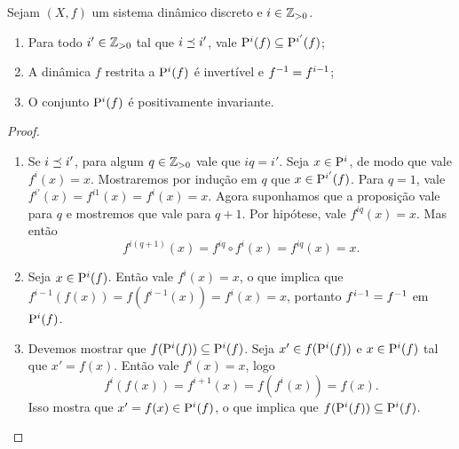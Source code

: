 \begin{proposition}
Sejam $(X,f)$ um sistema dinâmico discreto e $i \in \Z_{>0}$.
	\begin{enumerate}
	\item Para todo $i' \in \Z_{>0}$ tal que $i \dleq i'$, vale $\Per[i](f) \subseteq \Per[i'](f)$;
	\item A dinâmica $f$ restrita a $\Per[i](f)$ é invertível e $f\inv = f^{i-1}$;
	\item O conjunto $\Per[i](f)$ é positivamente invariante.
	\end{enumerate}
\end{proposition}
\begin{proof}
	\begin{enumerate}
	\item Se $i \dleq i'$, para algum $q \in \Z_{>0}$ vale que $iq=i'$. Seja $x \in \Per[i]$, de modo que vale $f^{i}(x)=x$. Mostraremos por indução em $q$ que $x \in \Per[i'](f)$. Para $q=1$, vale $f^{i'}(x) = f^{i1}(x) = f^i(x) = x$. Agora suponhamos que a proposição vale para $q$ e mostremos que vale para $q+1$. Por hipótese, vale $f^{iq}(x) = x$. Mas então
		\begin{equation*}
		f^{i(q+1)}(x) = f^{iq} \circ f^i(x) = f^{iq}(x) = x.
		\end{equation*}

	\item Seja $x \in \Per[i](f)$. Então vale $f^i(x)=x$, o que implica que $f^{i-1}(f(x)) = f(f^{i-1}(x)) = f^i(x) = x$, portanto $f^{i-1} = f\inv$ em $\Per[i](f)$.

	\item Devemos mostrar que $f(\Per[i](f)) \subseteq \Per[i](f)$. Seja $x' \in f(\Per[i](f))$ e $x \in \Per[i](f)$ tal que $x'=f(x)$. Então vale $f^i(x) = x$, logo
		\begin{equation*}
		f^i(f(x)) = f^{i+1}(x) = f(f^i(x)) = f(x).
		\end{equation*}
	Isso mostra que $x' = f(x) \in \Per[i](f)$, o que implica que $f(\Per[i](f)) \subseteq \Per[i](f)$.

	\end{enumerate}
\end{proof}


